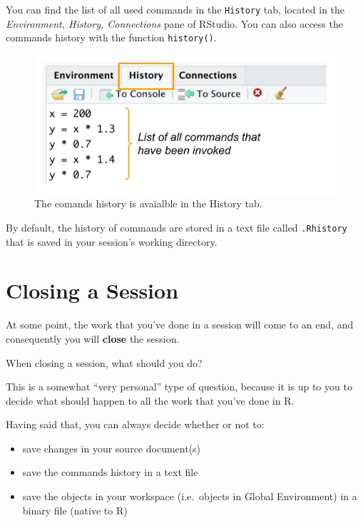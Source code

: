 \documentclass[
]{book}
\begin{document}
You can find the list of all used commands in the \texttt{History} tab,
located in the \emph{Environment, History, Connections} pane of RStudio. You can
also access the commands history with the function \texttt{history()}.

\begin{figure}

{\centering \includegraphics[width=0.65\linewidth]{images/rstudio/rstudio-history-tab} 

}

\caption{The comands history is avaialble in the History tab.}\label{fig:unnamed-chunk-35}
\end{figure}

By default, the history of commands are stored in a text file called \texttt{.Rhistory}
that is saved in your session's working directory.

\hypertarget{closing-a-session}{%
\section{Closing a Session}\label{closing-a-session}}

At some point, the work that you've done in a session will come to an end, and
consequently you will \textbf{close} the session.

When closing a session, what should you do?

This is a somewhat ``very personal'' type of question, because it is up to you to
decide what should happen to all the work that you've done in R.

Having said that, you can always decide whether or not to:

\begin{itemize}
\item
  save changes in your source document(s)
\item
  save the commands history in a text file
\item
  save the objects in your workspace (i.e.~objects in Global Environment) in
  a binary file (native to R)
\end{itemize}
\end{document}
